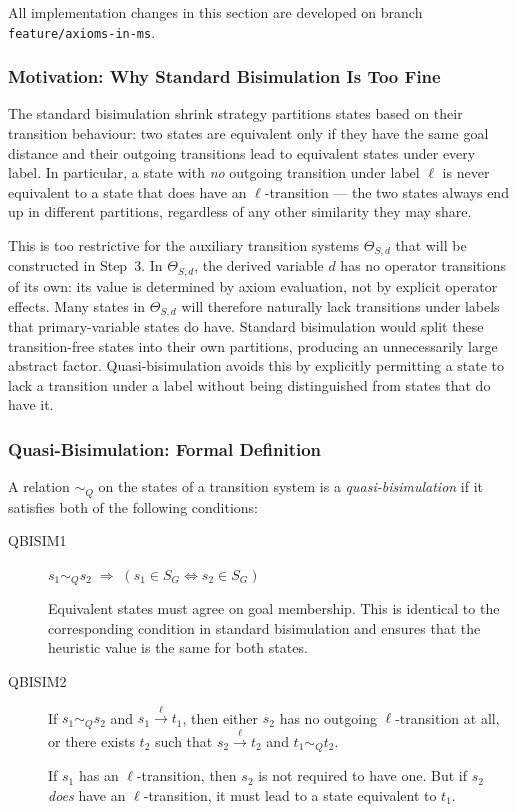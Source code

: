 \documentclass[11pt,a4paper]{article}
\begin{document}
All implementation changes in this section are developed on branch
\texttt{feature/axioms-in-ms}.

\subsubsection{Motivation: Why Standard Bisimulation Is Too Fine}

The standard bisimulation shrink strategy partitions states based on their
transition behaviour: two states are equivalent only if they have the same
goal distance and their outgoing transitions lead to equivalent states under
every label.  In particular, a state with \emph{no} outgoing transition under
label $\ell$ is never equivalent to a state that does have an $\ell$-transition
--- the two states always end up in different partitions, regardless of any
other similarity they may share.

This is too restrictive for the auxiliary transition systems $\Theta_{S,d}$
that will be constructed in Step~3.  In $\Theta_{S,d}$, the derived variable
$d$ has no operator transitions of its own: its value is determined by axiom
evaluation, not by explicit operator effects.  Many states in $\Theta_{S,d}$
will therefore naturally lack transitions under labels that primary-variable
states do have.  Standard bisimulation would split these transition-free states
into their own partitions, producing an unnecessarily large abstract factor.
Quasi-bisimulation avoids this by explicitly permitting a state to lack a
transition under a label without being distinguished from states that do have it.

\subsubsection{Quasi-Bisimulation: Formal Definition}

A relation $\sim_Q$ on the states of a transition system is a
\emph{quasi-bisimulation} if it satisfies both of the following conditions:

\begin{description}
  \item[QBISIM1] $s_1 \sim_Q s_2 \;\Rightarrow\; (s_1 \in S_G \iff s_2 \in S_G)$

  Equivalent states must agree on goal membership.  This is identical to the
  corresponding condition in standard bisimulation and ensures that the
  heuristic value is the same for both states.

  \item[QBISIM2] If $s_1 \sim_Q s_2$ and $s_1 \xrightarrow{\ell} t_1$, then
  either $s_2$ has no outgoing $\ell$-transition at all, or there exists $t_2$
  such that $s_2 \xrightarrow{\ell} t_2$ and $t_1 \sim_Q t_2$.

  If $s_1$ has an $\ell$-transition, then $s_2$ is not required to have one.
  But if $s_2$ \emph{does} have an $\ell$-transition, it must lead to a
  state equivalent to $t_1$.
\end{description}
\end{document}
